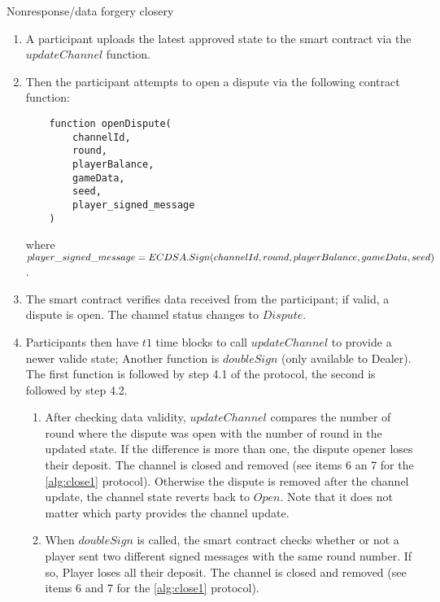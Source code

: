 \begin{algorithm}
\caption{Nonresponse/data forgery closery} \label{alg:close4}
\begin{enumerate}
	\item A participant uploads the latest approved state to the smart contract via the $updateChannel$ function.
	\item Then the participant attempts to open a dispute via the following contract function:
\begin{lstlisting}
    function openDispute(
        channelId,
        round,
        playerBalance,
        gameData,
        seed,
        player_signed_message
    )
\end{lstlisting}
where $player\_signed\_message = ECDSA.Sign(channelId, round, \\ playerBalance, gameData, seed)$.
	\item The smart contract verifies data received from the participant; if valid, a dispute is open. The channel status changes to $Dispute$.
	\item  Participants then have $t1$ time blocks to call $updateChannel$ to provide a newer valide state; Another function is  $doubleSign$ (only available to Dealer). The first function is followed by step 4.1 of the protocol, the second is followed by step 4.2.
\begin{enumerate}
	\item After checking data validity, $updateChannel$ compares the number of round where the dispute was open with the number of round in the updated state. If the difference is more than one, the dispute opener loses their deposit.  The channel is closed and removed (see items 6 an 7 for the \autoref{alg:close1} protocol). Otherwise the dispute is removed after the channel update, the channel state reverts back to $Open$. Note that it does not matter which party provides the channel update. \label{upd}
	\item When $doubleSign$ is called, the smart contract checks whether or not a player sent two different signed messages with the same round number. If so, Player loses all their deposit. The channel is closed and removed (see items 6 and 7 for the  \autoref{alg:close1} protocol). \label{dbl}
\end{enumerate}
\end{enumerate}
\end{algorithm}
